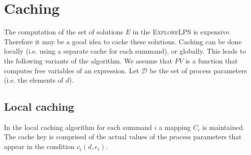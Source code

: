 \documentclass{article}
\begin{document}
\newpage
\section{Caching}
The computation of the set of solutions $E$ in the \textsc{ExploreLPS} is expensive. Therefore it may be a good idea to cache these solutions. Caching can be done locally (i.e. using a separate cache for each summand),
or globally. This leads to the following variants of the algorithm. We assume that $FV$ is a function that
computes free variables of an expression. Let $\mathcal{D}$ be the set of process parameters
(i.e. the elements of $d$).

\subsection{Local caching}
In the local caching algorithm for each summand $i$ a mapping $C_i$ is maintained. The cache key is comprised of the actual values of the process parameters that appear in the condition $c_i(d, e_i)$.
\end{document}

